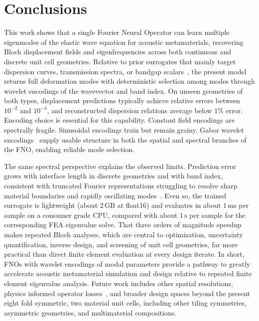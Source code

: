 \documentclass[preprint,review,12pt,numafflabel]{elsarticle}
\begin{document}
\section{Conclusions}
\label{sec:Conclusion}
This work shows that a single Fourier Neural Operator can learn multiple eigenmodes of the elastic wave equation for acoustic metamaterials, recovering Bloch displacement fields and eigenfrequencies across both continuous and discrete unit cell geometries. Relative to prior surrogates that mainly target dispersion curves, transmission spectra, or bandgap scalars~\cite{Ogren2024gpr,wagner2024neural,liu2026hybridfno}, the present model returns full deformation modes with deterministic selection among modes through wavelet encodings of the wavevector and band index. On unseen geometries of both types, displacement predictions typically achieve relative errors between $10^{-2}$ and $10^{-4}$, and reconstructed dispersion relations average below $1\%$ error. Encoding choice is essential for this capability. Constant field encodings are spectrally fragile. Sinusoidal encodings train but remain grainy. Gabor wavelet encodings~\cite{gabor1946theory} supply usable structure in both the spatial and spectral branches of the FNO, enabling reliable mode selection.

The same spectral perspective explains the observed limits. Prediction error grows with interface length in discrete geometries and with band index, consistent with truncated Fourier representations struggling to resolve sharp material boundaries and rapidly oscillating modes~\cite{rahaman2019spectral,qin2024spectralfno,cavallazzi2026whno}. Even so, the trained surrogate is lightweight (about $2\,\mathrm{GB}$ at float16) and evaluates in about $1\,\mathrm{ms}$ per sample on a consumer grade CPU, compared with about $1\,\mathrm{s}$ per sample for the corresponding FEA eigenvalue solve. That three orders of magnitude speedup makes repeated Bloch analyses, which are central to optimization, uncertainty quantification, inverse design, and screening of unit cell geometries, far more practical than direct finite element evaluation at every design iterate. In short, FNOs with wavelet encodings of modal parameters provide a pathway to greatly accelerate acoustic metamaterial simulation and design relative to repeated finite element eigenvalue analysis. Future work includes other spatial resolutions, physics informed operator losses~\cite{wang2021pidon}, and broader design spaces beyond the present eight fold symmetric, two material unit cells, including other tiling symmetries, asymmetric geometries, and multimaterial compositions.
\end{document}
